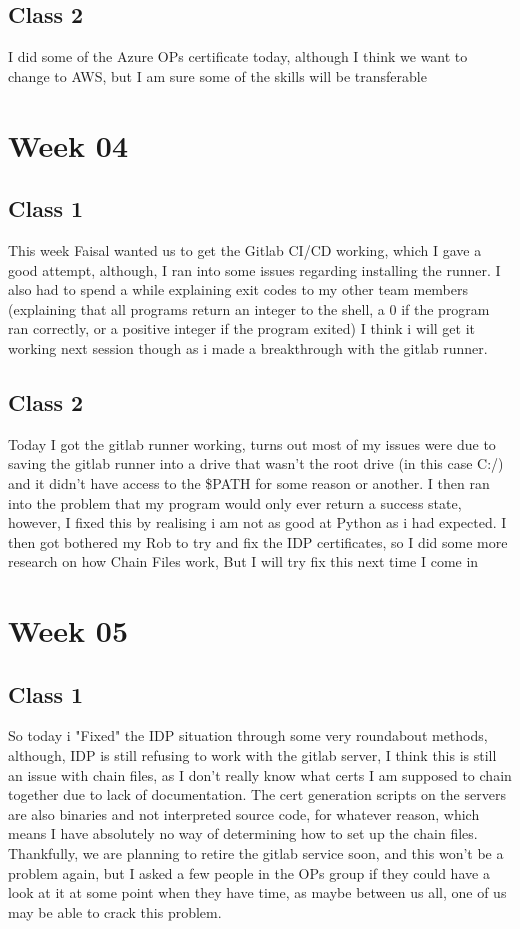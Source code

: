 \documentclass{article}
\begin{document}
\subsection{Class 2}
I did some of the Azure OPs certificate today, although I think we want to change to AWS, but I am sure some of the skills will be transferable
\section{Week 04}
\subsection{Class 1}
This week Faisal wanted us to get the Gitlab CI/CD working, which I gave a good attempt, although, I ran into some issues regarding
installing the runner. I also had to spend a while explaining exit codes to my other team members (explaining that all programs return
an integer to the shell, a 0 if the program ran correctly, or a positive integer if the program exited) I think i will get it working next
session though as i made a breakthrough with the gitlab runner.
\subsection{Class 2}
Today I got the gitlab runner working, turns out most of my issues were due to saving the gitlab runner into a drive that wasn't the 
root drive (in this case C:/) and it didn't have access to the \$PATH for some reason or another. I then ran into the problem that my program
would only ever return a success state, however, I fixed this by realising i am not as good at Python as i had expected. I then got bothered
my Rob to try and fix the IDP certificates, so I did some more research on how Chain Files work, But I will try fix this next time I come in
\section{Week 05}
\subsection{Class 1}
So today i "Fixed" the IDP situation through some very roundabout methods, although, IDP is still refusing to work with the gitlab server, I
think this is still an issue with chain files, as I don't really know what certs I am supposed to chain together due to lack of documentation.
The cert generation scripts on the servers are also binaries and not interpreted source code, for whatever reason, which means I have absolutely
no way of determining how to set up the chain files. Thankfully, we are planning to retire the gitlab service soon, and this won't be a problem
again, but I asked a few people in the OPs group if they could have a look at it at some point when they have time, as maybe between us all, 
one of us may be able to crack this problem.
\end{document}

